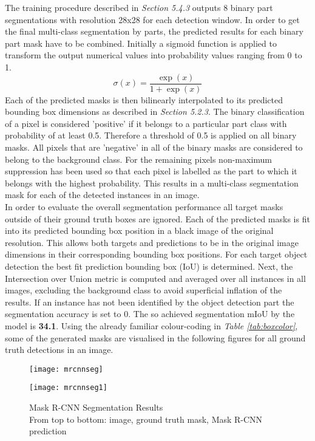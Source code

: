 \documentclass[main.tex]{subfiles}
\begin{document}
\indent  The training procedure described in \emph{Section 5.4.3} outputs 8 binary part segmentations with resolution 28x28 for each detection window. In order to get the final multi-class segmentation by parts, the predicted results for each binary part mask have to be combined. Initially a sigmoid function is applied to transform the output numerical values into probability values ranging from 0 to 1.
\begin{equation}
\sigma(x) = \frac{\exp(x)}{1 + \exp(x)}
\end{equation}
\indent Each of the predicted masks is then bilinearly interpolated to its predicted bounding box dimensions as described in \emph{Section 5.2.3}. The binary classification of a pixel is considered 'positive' if it belongs to a particular part class with probability of at least 0.5. Therefore a threshold of 0.5 is applied on all binary masks. All pixels that are 'negative' in all of the binary masks are considered to belong to the background class. For the remaining pixels non-maximum suppression has been used so that each pixel is labelled as the part to which it belongs with the highest probability. This results in a multi-class segmentation mask for each of the detected instances in an image. \\
\indent  In order to evaluate the overall segmentation performance all target masks outside of their ground truth boxes are ignored. Each of the predicted masks is fit into its predicted bounding box position in a black image of the original resolution. This allows both targets and predictions to be in the original image dimensions in their corresponding bounding box positions. For each target object detection the best fit prediction bounding box (IoU) is determined. Next, the Intersection over Union metric is computed and averaged over all instances in all images, excluding the background class to avoid superficial inflation of the results. If an instance has not been identified by the object detection part the segmentation accuracy is set to 0. The so achieved segmentation mIoU by the model is \textbf{34.1}. Using the already familiar colour-coding in \emph{Table \ref{tab:boxcolor}}, some of the generated masks are visualised in the following figures for all ground truth detections in an image.\\
\begin{figure}[H]
\centering
\texttt{[image: mrcnnseg]}
\end{figure}
\begin{figure}[h]
\centering
\texttt{[image: mrcnnseg1]}
\captionsetup{justification=centering}
\caption{Mask R-CNN Segmentation Results \\ From top to bottom: image, ground truth mask, Mask R-CNN prediction}
\label{fig:mrcnn_masks}
\end{figure}
\end{document}
